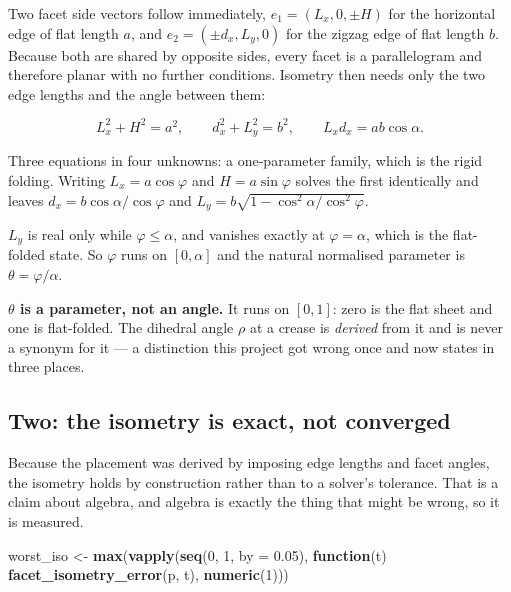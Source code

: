 \documentclass[
  british,
  a4paper,
]{book}
\newenvironment{Shaded}{\begin{snugshade}}{\end{snugshade}}
\newcommand{\AttributeTok}[1]{\textcolor[rgb]{0.13,0.29,0.53}{#1}}
\newcommand{\ControlFlowTok}[1]{\textcolor[rgb]{0.13,0.29,0.53}{\textbf{#1}}}
\newcommand{\DecValTok}[1]{\textcolor[rgb]{0.00,0.00,0.81}{#1}}
\newcommand{\FloatTok}[1]{\textcolor[rgb]{0.00,0.00,0.81}{#1}}
\newcommand{\FunctionTok}[1]{\textcolor[rgb]{0.13,0.29,0.53}{\textbf{#1}}}
\newcommand{\NormalTok}[1]{#1}
\newcommand{\OtherTok}[1]{\textcolor[rgb]{0.56,0.35,0.01}{#1}}
\begin{document}
Two facet side vectors follow immediately, \(e_1 = (L_x, 0, \pm H)\) for the
horizontal edge of flat length \(a\), and \(e_2 = (\pm d_x, L_y, 0)\) for the zigzag
edge of flat length \(b\). Because both are shared by opposite sides, every facet
is a parallelogram and therefore planar with no further conditions. Isometry
then needs only the two edge lengths and the angle between them:

\[L_x^2 + H^2 = a^2, \qquad d_x^2 + L_y^2 = b^2, \qquad L_x d_x = ab\cos\alpha .\]

Three equations in four unknowns: a one-parameter family, which is the rigid
folding. Writing \(L_x = a\cos\varphi\) and \(H = a\sin\varphi\) solves the first
identically and leaves \(d_x = b\cos\alpha/\cos\varphi\) and
\(L_y = b\sqrt{1 - \cos^2\alpha/\cos^2\varphi}\).

\(L_y\) is real only while \(\varphi \le \alpha\), and vanishes exactly at
\(\varphi = \alpha\), which is the flat-folded state. So \(\varphi\) runs on
\([0, \alpha]\) and the natural normalised parameter is \(\theta = \varphi/\alpha\).

\textbf{\(\theta\) is a parameter, not an angle.} It runs on \([0, 1]\): zero is the flat
sheet and one is flat-folded. The dihedral angle \(\rho\) at a crease is \emph{derived}
from it and is never a synonym for it --- a distinction this project got wrong
once and now states in three places.

\subsection{Two: the isometry is exact, not converged}\label{two-the-isometry-is-exact-not-converged}

Because the placement was derived by imposing edge lengths and facet angles, the
isometry holds by construction rather than to a solver's tolerance. That is a
claim about algebra, and algebra is exactly the thing that might be wrong, so it
is measured.

\begin{Shaded}
\begin{Highlighting}[]
\NormalTok{worst\_iso }\OtherTok{\textless{}{-}} \FunctionTok{max}\NormalTok{(}\FunctionTok{vapply}\NormalTok{(}\FunctionTok{seq}\NormalTok{(}\DecValTok{0}\NormalTok{, }\DecValTok{1}\NormalTok{, }\AttributeTok{by =} \FloatTok{0.05}\NormalTok{),}
                        \ControlFlowTok{function}\NormalTok{(t) }\FunctionTok{facet\_isometry\_error}\NormalTok{(p, t), }\FunctionTok{numeric}\NormalTok{(}\DecValTok{1}\NormalTok{)))}
\end{Highlighting}
\end{Shaded}
\end{document}
